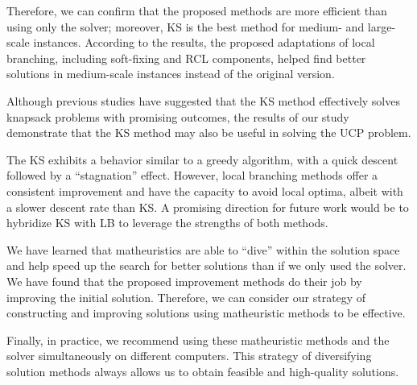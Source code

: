 Therefore, we can confirm that the proposed methods are more efficient than using only the solver; moreover, KS is the best method for medium- and large-scale instances.
According to the results, the proposed adaptations of local branching, including soft-fixing and RCL components, helped find better solutions in medium-scale instances instead of the original version.

Although previous studies have suggested that the KS method effectively solves knapsack problems with promising outcomes, the results of our study demonstrate that the KS method may also be useful in solving the UCP problem.

The KS exhibits a behavior similar to a greedy algorithm, with a quick descent followed by a ``stagnation'' effect. However, local branching methods offer a consistent improvement and have the capacity to avoid local optima, albeit with a slower descent rate than KS. A promising direction for future work would be to hybridize KS with LB to leverage the strengths of both methods.

We have learned that matheuristics are able to ``dive'' within the solution space and help speed up the search for better solutions than if we only used the solver. 
%
We have found that the proposed improvement methods do their job by improving the initial solution. Therefore, we can consider our strategy of constructing and improving solutions using matheuristic methods to be effective.

Finally, in practice, we recommend using these matheuristic methods and the solver simultaneously on different computers. This strategy of diversifying solution methods always allows us to obtain feasible and high-quality solutions.

